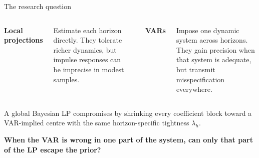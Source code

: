 \documentclass[aspectratio=169,11pt]{beamer}
\begin{document}
\begin{frame}{The research question}
  \vspace{-1mm}
  \begin{columns}[T,onlytextwidth]
      {\fontsize{19}{22}\selectfont\color{Teal}\bfseries Local projections}\par
      \vspace{2mm}
      Estimate each horizon directly. They tolerate richer dynamics, but
      impulse responses can be imprecise in modest samples.

      \centering
      \vspace{10mm}
      {\color{LightGray}\rule{0.7pt}{25mm}}

      {\fontsize{19}{22}\selectfont\color{Orange}\bfseries VARs}\par
      \vspace{2mm}
      Impose one dynamic system across horizons. They gain precision when
      that system is adequate, but transmit misspecification everywhere.
  \end{columns}

  \vspace{5mm}
  {\fontsize{14.3}{18}\selectfont\color{MidGray}
    A global Bayesian LP compromises by shrinking every coefficient block
    toward a VAR-implied centre with the same horizon-specific tightness
    $\lambda_h$.}

  \vspace{5mm}
  \colorbox{PaleTeal}{%
    \parbox{0.955\textwidth}{%
      \vspace{2.2mm}
      {\fontsize{20}{24}\selectfont\bfseries
       When the VAR is wrong in one part of the system, can only that part
       of the LP escape the prior?}
      \vspace{2.2mm}
    }%
  }
\end{frame}
\end{document}
